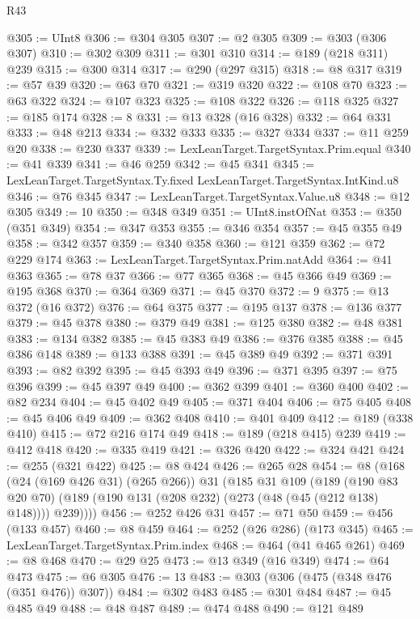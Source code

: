 \begin{lexlean}{R43}
\begin{coremodule}
@305 := UInt8
@306 := @304 @305
@307 := @2 @305
@309 := @303 (@306 @307)
@310 := @302 @309
@311 := @301 @310
@314 := @189 (@218 @311) @239
@315 := @300 @314
@317 := @290 (@297 @315)
@318 := @8 @317
@319 := @57 @39
@320 := @63 @70
@321 := @319 @320
@322 := @108 @70
@323 := @63 @322
@324 := @107 @323
@325 := @108 @322
@326 := @118 @325
@327 := @185 @174
@328 := 8
@331 := @13 @328 (@16 @328)
@332 := @64 @331
@333 := @48 @213
@334 := @332 @333
@335 := @327 @334
@337 := @11 @259 @20
@338 := @230 @337
@339 := LexLeanTarget.TargetSyntax.Prim.equal
@340 := @41 @339
@341 := @46 @259
@342 := @45 @341
@345 := LexLeanTarget.TargetSyntax.Ty.fixed LexLeanTarget.TargetSyntax.IntKind.u8
@346 := @76 @345
@347 := LexLeanTarget.TargetSyntax.Value.u8
@348 := @12 @305
@349 := 10
@350 := @348 @349
@351 := UInt8.instOfNat
@353 := @350 (@351 @349)
@354 := @347 @353
@355 := @346 @354
@357 := @45 @355 @49
@358 := @342 @357
@359 := @340 @358
@360 := @121 @359
@362 := @72 @229 @174
@363 := LexLeanTarget.TargetSyntax.Prim.natAdd
@364 := @41 @363
@365 := @78 @37
@366 := @77 @365
@368 := @45 @366 @49
@369 := @195 @368
@370 := @364 @369
@371 := @45 @370
@372 := 9
@375 := @13 @372 (@16 @372)
@376 := @64 @375
@377 := @195 @137
@378 := @136 @377
@379 := @45 @378
@380 := @379 @49
@381 := @125 @380
@382 := @48 @381
@383 := @134 @382
@385 := @45 @383 @49
@386 := @376 @385
@388 := @45 @386 @148
@389 := @133 @388
@391 := @45 @389 @49
@392 := @371 @391
@393 := @82 @392
@395 := @45 @393 @49
@396 := @371 @395
@397 := @75 @396
@399 := @45 @397 @49
@400 := @362 @399
@401 := @360 @400
@402 := @82 @234
@404 := @45 @402 @49
@405 := @371 @404
@406 := @75 @405
@408 := @45 @406 @49
@409 := @362 @408
@410 := @401 @409
@412 := @189 (@338 @410)
@415 := @72 @216 @174 @49
@418 := @189 (@218 @415) @239
@419 := @412 @418
@420 := @335 @419
@421 := @326 @420
@422 := @324 @421
@424 := @255 (@321 @422)
@425 := @8 @424
@426 := @265 @28
@454 := @8
    (@168
      (@24 (@169 @426 @31) (@265 @266))
      @31
      (@185
        @31
        @109
        (@189
          (@190 @83 @20 @70)
          (@189 (@190 @131 (@208 @232) (@273 (@48 (@45 (@212 @138) @148)))) @239))))
@456 := @252 @426 @31
@457 := @71 @50
@459 := @456 (@133 @457)
@460 := @8 @459
@464 := @252 (@26 @286) (@173 @345)
@465 := LexLeanTarget.TargetSyntax.Prim.index
@468 := @464 (@41 @465 @261)
@469 := @8 @468
@470 := @29 @25
@473 := @13 @349 (@16 @349)
@474 := @64 @473
@475 := @6 @305
@476 := 13
@483 := @303 (@306 (@475 (@348 @476 (@351 @476)) @307))
@484 := @302 @483
@485 := @301 @484
@487 := @45 @485 @49
@488 := @48 @487
@489 := @474 @488
@490 := @121 @489

\end{coremodule}
\end{lexlean}

